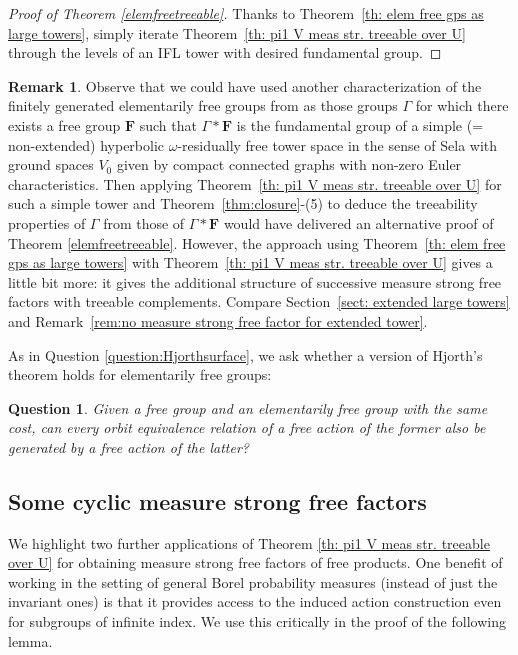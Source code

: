 \documentclass[11pt]{amsart}
\theoremstyle{definition}
\newtheorem{remark}[definition]{Remark}
\theoremstyle{plain}
\newtheorem{question}[definition]{Question}
\newcommand{\<}{\langle}
\renewcommand{\>}{\rangle}
\newcommand{\FF}{\mathbf{F}}
\newcommand{\pmp}{\text{p.m.p.}}
\begin{document}
\begin{proof}[Proof of Theorem \ref{elemfreetreeable}]
  Thanks to Theorem~\ref{th: elem free gps as large towers}, simply iterate Theorem~\ref{th: pi1 V meas str. treeable over U} through the levels of an IFL tower with desired fundamental group.
\end{proof}

\begin{remark}
Observe that we could  have used another characterization of the finitely generated elementarily free groups from
\cite[Corollary 7.10.6 or 7.10.7] {Guirardel-Levitt-Sklinos-2020}
as those groups $\Gamma$ for which there exists a free group $\FF$ such that $\Gamma*\FF$ is the fundamental group of a simple (= non-extended) hyperbolic $\omega$-residually free tower space in the sense of Sela \cite{SeVI} with ground spaces $V_0$ given by compact connected graphs with non-zero Euler characteristics.
Then applying Theorem~\ref{th: pi1 V meas str. treeable over U} for such a simple tower
and Theorem~\ref{thm:closure}-(5) to deduce the treeability properties of $\Gamma$ from those of $\Gamma*\FF$ would have delivered an alternative proof of  Theorem \ref{elemfreetreeable}.
However, the approach using Theorem~\ref{th: elem free gps as large towers}  with Theorem~\ref{th: pi1 V meas str. treeable over U} gives a little bit more: it gives the additional structure of successive measure strong free factors with treeable complements.
Compare Section~\ref{sect: extended large towers} and Remark~\ref{rem:no measure strong free factor for extended tower}.
\end{remark}


As in Question \ref{question:Hjorthsurface}, we ask whether a version of Hjorth's theorem \cite{Hjo-cost-att} holds for elementarily free groups:
\begin{question}
  Given a free group and an elementarily free group with the same cost, can every orbit equivalence relation of a free \pmp{} action of the former also be generated by a free action of the latter?
\end{question}

\subsection{Some cyclic measure strong free factors}\label{sec:cyclicmff}

We highlight two further applications of Theorem \ref{th: pi1 V meas str. treeable over U} for obtaining measure strong free factors of free products. One benefit of working in the setting of general Borel probability measures (instead of just the invariant ones) is that it provides access to the induced action construction even for subgroups of infinite index. We use this critically in the proof of the following lemma.
\end{document}
